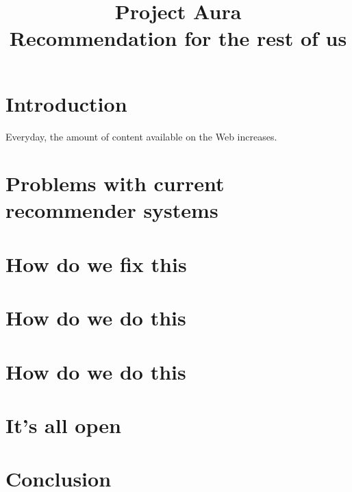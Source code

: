 \documentclass{article}
\title{Project Aura \\ Recommendation for the rest of us}
\begin{document}
%
\maketitle

\section{Introduction}
Everyday, the amount of content available on the Web increases.

\section{Problems with current recommender systems}

\section{How do we fix this}


\section{How do we do this}
\section{How do we do this}

\section{It's all open}

\section{Conclusion}
\end{document}
